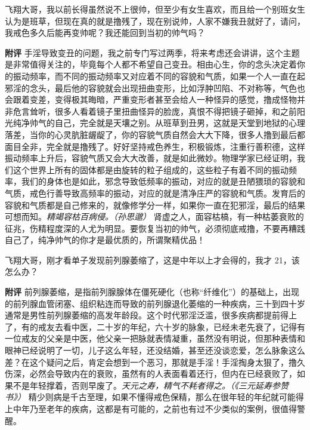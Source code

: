 \begin{case}
    飞翔大哥，我以前长得虽然说不上很帅，但至少有女生喜欢，而且给一个别班女生认为是班草，但现在真的就是撸残了，现在别说帅，人家不嫌我丑就好了，请问，我戒色多久后能再变帅呢？我还能回到当初的帅气吗？

    \textbf{附评} 手淫导致变丑的问题，我之前专门写过两季，将来考虑还会讲讲，这个主题是非常值得关注的，毕竟每个人都不希望自己变丑。相由心生，你的念头决定着你的振动频率，而不同的振动频率又对应着不同的容貌和气质，如果一个人一直在起邪淫的念头，最后他的容貌就会出现扭曲变形，比如浮肿凹陷、不对称等，气色也会跟着变差，变得极其晦暗，严重变形者甚至会给人一种怪异的感觉，撸成怪物并非危言耸听，很多人看着镜子里扭曲怪异的脸庞，真恨不得把镜子砸掉，和之前阳光纯净帅气的自己，完全就是天壤之别。从班草到丑男，这就是天堂到地狱的心理落差，当你的心灵肮脏龌龊了，你的容貌气质自然会大大下降，很多人撸到最后都面目全非，完全就是撸残了。好好坚持戒色养生，积极锻炼，注重行善积德，这样振动频率上升后，容貌气质又会大大改善，就是如此微妙。物理学家已经证明，我们这个世界上所有的固体都是由旋转的粒子组成的，这些粒子有着不同的振动频率，我们的身体也是如此，邪念导致低频率的振动，对应的就是丑陋猥琐的容貌和气质，戒色行善导致高频率的振动，对应的就是清净庄严的容貌和气质。发育后的容貌和气质都是自己修来的，就像修学分一样，如果你一直在犯邪淫，最后的结果可想而知。\textit{精竭容枯百病侵。（孙思邈）} 肾虚之人，面容枯槁，有一种枯萎衰败的征兆，伤精程度深的人尤为明显。要恢复当初的帅气，必须彻底戒撸，不要再糟践自己了，纯净帅气的你才是最优质的，所谓聚精优品！
\end{case}

\begin{case}
    飞翔大哥，刚才看单子发现前列腺萎缩了，这是中年以上才会得的，我才 21，该怎么办？

    \textbf{附评} 前列腺萎缩，是指前列腺腺体在僵死硬化（也称“纤维化”）的基础上，出现的前列腺血管闭塞、组织粘连而导致的前列腺退化萎缩的一种疾病，三十到四十岁通常是男性前列腺萎缩的高发年龄段。这个时代邪淫泛滥，很多疾病都提前得上了，有的戒友去看中医，二十岁的年纪，六十岁的脉象，已经未老先衰了，记得有一位戒友的父亲是中医，他父亲一把脉就表情凝重，虽然没有明说，但那种表情和眼神已经说明了一切，儿子这么年轻，还没结婚，甚至还没谈恋爱，怎么脉象这么差？在这个疑问之后，肯定会想到一个恶习，那就是手淫！手淫掏身太狠了，撸久伤深，必然会导致内在的衰败，虽然有的人表面看着还行，但内在已经衰败了，如果不是年轻撑着，否则早废了。\textit{天元之寿，精气不耗者得之。（《三元延寿参赞书》）} 精少则病是千古至理，如果不懂得戒色保精，那么在很年轻的年纪就可能得上中年乃至老年的疾病，这都是有可能的，之前也有过不少类似的案例，很值得警醒。
\end{case}

